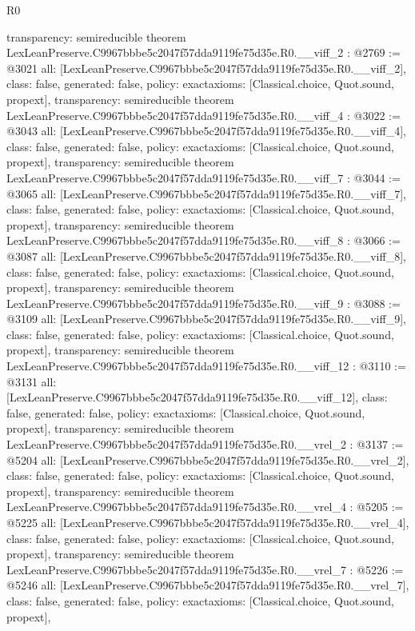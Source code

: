 \begin{lexlean}{R0}
\begin{coremodule}
{  transparency: semireducible
}
theorem LexLeanPreserve.C9967bbbe5c2047f57dda9119fe75d35e.R0.__viff_2 : @2769 := @3021 {
  all: [LexLeanPreserve.C9967bbbe5c2047f57dda9119fe75d35e.R0.__viff_2],
  class: false,
  generated: false,
  policy: exact{axioms: [Classical.choice, Quot.sound, propext]},
  transparency: semireducible
}
theorem LexLeanPreserve.C9967bbbe5c2047f57dda9119fe75d35e.R0.__viff_4 : @3022 := @3043 {
  all: [LexLeanPreserve.C9967bbbe5c2047f57dda9119fe75d35e.R0.__viff_4],
  class: false,
  generated: false,
  policy: exact{axioms: [Classical.choice, Quot.sound, propext]},
  transparency: semireducible
}
theorem LexLeanPreserve.C9967bbbe5c2047f57dda9119fe75d35e.R0.__viff_7 : @3044 := @3065 {
  all: [LexLeanPreserve.C9967bbbe5c2047f57dda9119fe75d35e.R0.__viff_7],
  class: false,
  generated: false,
  policy: exact{axioms: [Classical.choice, Quot.sound, propext]},
  transparency: semireducible
}
theorem LexLeanPreserve.C9967bbbe5c2047f57dda9119fe75d35e.R0.__viff_8 : @3066 := @3087 {
  all: [LexLeanPreserve.C9967bbbe5c2047f57dda9119fe75d35e.R0.__viff_8],
  class: false,
  generated: false,
  policy: exact{axioms: [Classical.choice, Quot.sound, propext]},
  transparency: semireducible
}
theorem LexLeanPreserve.C9967bbbe5c2047f57dda9119fe75d35e.R0.__viff_9 : @3088 := @3109 {
  all: [LexLeanPreserve.C9967bbbe5c2047f57dda9119fe75d35e.R0.__viff_9],
  class: false,
  generated: false,
  policy: exact{axioms: [Classical.choice, Quot.sound, propext]},
  transparency: semireducible
}
theorem LexLeanPreserve.C9967bbbe5c2047f57dda9119fe75d35e.R0.__viff_12 : @3110 := @3131 {
  all: [LexLeanPreserve.C9967bbbe5c2047f57dda9119fe75d35e.R0.__viff_12],
  class: false,
  generated: false,
  policy: exact{axioms: [Classical.choice, Quot.sound, propext]},
  transparency: semireducible
}
theorem LexLeanPreserve.C9967bbbe5c2047f57dda9119fe75d35e.R0.__vrel_2 : @3137 := @5204 {
  all: [LexLeanPreserve.C9967bbbe5c2047f57dda9119fe75d35e.R0.__vrel_2],
  class: false,
  generated: false,
  policy: exact{axioms: [Classical.choice, Quot.sound, propext]},
  transparency: semireducible
}
theorem LexLeanPreserve.C9967bbbe5c2047f57dda9119fe75d35e.R0.__vrel_4 : @5205 := @5225 {
  all: [LexLeanPreserve.C9967bbbe5c2047f57dda9119fe75d35e.R0.__vrel_4],
  class: false,
  generated: false,
  policy: exact{axioms: [Classical.choice, Quot.sound, propext]},
  transparency: semireducible
}
theorem LexLeanPreserve.C9967bbbe5c2047f57dda9119fe75d35e.R0.__vrel_7 : @5226 := @5246 {
  all: [LexLeanPreserve.C9967bbbe5c2047f57dda9119fe75d35e.R0.__vrel_7],
  class: false,
  generated: false,
  policy: exact{axioms: [Classical.choice, Quot.sound, propext]},
}
\end{coremodule}
\end{lexlean}
